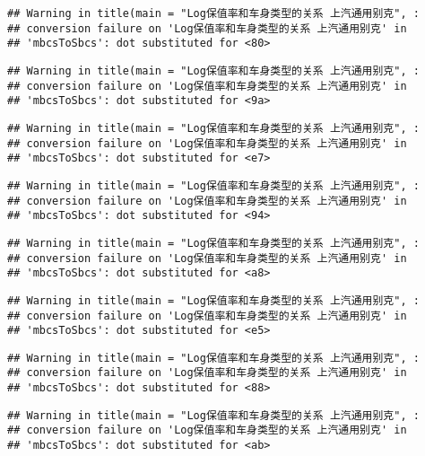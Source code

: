 \documentclass[]{article}
\begin{document}
\begin{verbatim}
## Warning in title(main = "Log保值率和车身类型的关系 上汽通用别克", :
## conversion failure on 'Log保值率和车身类型的关系 上汽通用别克' in
## 'mbcsToSbcs': dot substituted for <80>
\end{verbatim}

\begin{verbatim}
## Warning in title(main = "Log保值率和车身类型的关系 上汽通用别克", :
## conversion failure on 'Log保值率和车身类型的关系 上汽通用别克' in
## 'mbcsToSbcs': dot substituted for <9a>
\end{verbatim}

\begin{verbatim}
## Warning in title(main = "Log保值率和车身类型的关系 上汽通用别克", :
## conversion failure on 'Log保值率和车身类型的关系 上汽通用别克' in
## 'mbcsToSbcs': dot substituted for <e7>
\end{verbatim}

\begin{verbatim}
## Warning in title(main = "Log保值率和车身类型的关系 上汽通用别克", :
## conversion failure on 'Log保值率和车身类型的关系 上汽通用别克' in
## 'mbcsToSbcs': dot substituted for <94>
\end{verbatim}

\begin{verbatim}
## Warning in title(main = "Log保值率和车身类型的关系 上汽通用别克", :
## conversion failure on 'Log保值率和车身类型的关系 上汽通用别克' in
## 'mbcsToSbcs': dot substituted for <a8>
\end{verbatim}

\begin{verbatim}
## Warning in title(main = "Log保值率和车身类型的关系 上汽通用别克", :
## conversion failure on 'Log保值率和车身类型的关系 上汽通用别克' in
## 'mbcsToSbcs': dot substituted for <e5>
\end{verbatim}

\begin{verbatim}
## Warning in title(main = "Log保值率和车身类型的关系 上汽通用别克", :
## conversion failure on 'Log保值率和车身类型的关系 上汽通用别克' in
## 'mbcsToSbcs': dot substituted for <88>
\end{verbatim}

\begin{verbatim}
## Warning in title(main = "Log保值率和车身类型的关系 上汽通用别克", :
## conversion failure on 'Log保值率和车身类型的关系 上汽通用别克' in
## 'mbcsToSbcs': dot substituted for <ab>
\end{verbatim}
\end{document}
